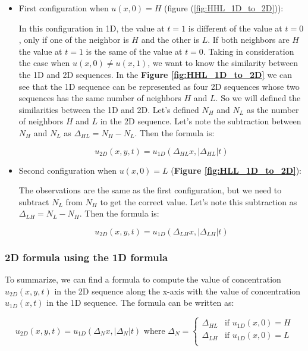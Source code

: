 \begin{itemize}
    \item First configuration when $u(x,0)=H$ (figure (\ref{fig:HHL_1D_to_2D})):
    
    In this configuration in 1D, the value at $t=1$ is different of the value at $t=0$,
    only if one of the neighbor is $H$ and the other is $L$. If both neighbors are $H$
    the value at $t=1$ is the same of the value at $t=0$. Taking in consideration the
    case when $u(x,0) \neq u(x,1)$, we want to know the similarity between the 1D and 2D
    sequences. In the \textbf{Figure \ref{fig:HHL_1D_to_2D}} we can see that the 1D sequence
    can be represented as four 2D sequences whose two sequences has the same number of 
    neighbors $H$ and $L$. So we will defined the similarities between the 1D and 2D.
    Let's defined $N_H$ and $N_L$ as the number of neighbors $H$ and $L$ in the 2D sequence.
    Let's note the subtraction between $N_H$ and $N_L$ as $\Delta_{HL}=N_H-N_L$. 
    Then the formula is:

    \begin{equation}
        u_{2D}(x,y,t)=u_{1D}(\Delta_{HL} x,|\Delta_{HL}|t) 
        \label{eq:2D_1D_H}
    \end{equation}
    
    \item Second configuration when $u(x,0)=L$ (\textbf{Figure \ref{fig:HLL_1D_to_2D}}):
    
    The observations are the same as the first configuration, but we need to subtract 
    $N_L$ from $N_H$ to get the correct value. Let's note this subtraction as 
    $\Delta_{LH}=N_L-N_H$. Then the formula is:

    \begin{equation}
        u_{2D}(x,y,t)=u_{1D}(\Delta_{LH} x,|\Delta_{LH}|t) 
        \label{eq:2D_1D_L}
    \end{equation}
\end{itemize}

\subsubsection{2D formula using the 1D formula}

To summarize, we can find a formula to compute the value of concentration $u_{2D}(x,y,t)$
in the 2D sequence along the x-axis with the value of concentration $u_{1D}(x,t)$ in the 
1D sequence. The formula can be written as:

\begin{equation}
    u_{2D}(x,y,t)=u_{1D}(\Delta_N x,|\Delta_N|t) 
    \mbox{ where } \Delta_N=
    \begin{cases}
        \Delta_{HL}&\text{if }u_{1D}(x,0) = H\\
        \Delta_{LH}&\text{if }u_{1D}(x,0) = L\\
    \end{cases}
    \label{eq:2D_1D}
\end{equation}

